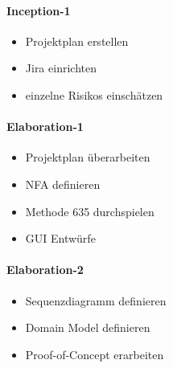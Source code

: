 \paragraph*{Inception-1}
\begin{itemize}
  \item Projektplan erstellen
  \item Jira einrichten
  \item einzelne Risikos einschätzen
\end{itemize}

\paragraph*{Elaboration-1}
\begin{itemize}
  \item Projektplan überarbeiten
  \item NFA definieren
  \item Methode 635 durchspielen
  \item GUI Entwürfe 
\end{itemize}

\paragraph*{Elaboration-2}
\begin{itemize}
  \item Sequenzdiagramm definieren
  \item Domain Model definieren
  \item Proof-of-Concept erarbeiten
\end{itemize}



